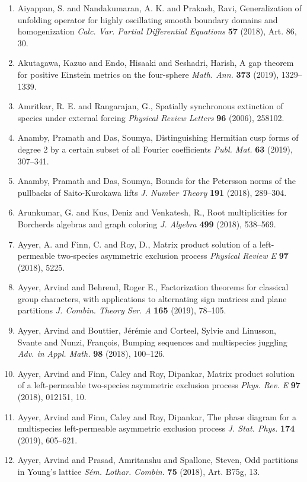 \begin{enumerate}
\item Aiyappan, S. and Nandakumaran, A. K. and Prakash, Ravi, Generalization of unfolding operator for highly oscillating
smooth boundary domains and homogenization {\em Calc. Var. Partial Differential Equations} {\bf 57} (2018), Art. 86, 30.
\item Akutagawa, Kazuo and Endo, Hisaaki and Seshadri, Harish, A gap theorem for positive {E}instein metrics on the
four-sphere {\em Math. Ann.} {\bf 373} (2019), 1329--1339.
\item Amritkar, R. E. and Rangarajan, G., Spatially synchronous extinction of species under external forcing {\em Physical Review Letters} {\bf 96} (2006), 258102.
\item Anamby, Pramath and Das, Soumya, Distinguishing {H}ermitian cusp forms of degree 2 by a certain
subset of all {F}ourier coefficients {\em Publ. Mat.} {\bf 63} (2019), 307--341.
\item Anamby, Pramath and Das, Soumya, Bounds for the {P}etersson norms of the pullbacks of
{S}aito-{K}urokawa lifts {\em J. Number Theory} {\bf 191} (2018), 289--304.
\item Arunkumar, G. and Kus, Deniz and Venkatesh, R., Root multiplicities for {B}orcherds algebras and graph
coloring {\em J. Algebra} {\bf 499} (2018), 538--569.
\item Ayyer, A. and Finn, C. and Roy, D., Matrix product solution of a left-permeable two-species asymmetric exclusion process {\em Physical Review E} {\bf 97} (2018), 5225.
\item Ayyer, Arvind and Behrend, Roger E., Factorization theorems for classical group characters, with
applications to alternating sign matrices and plane
partitions {\em J. Combin. Theory Ser. A} {\bf 165} (2019), 78--105.
\item Ayyer, Arvind and Bouttier, J\'{e}r\'{e}mie and Corteel, Sylvie and
Linusson, Svante and Nunzi, Fran\c{c}ois, Bumping sequences and multispecies juggling {\em Adv. in Appl. Math.} {\bf 98} (2018), 100--126.
\item Ayyer, Arvind and Finn, Caley and Roy, Dipankar, Matrix product solution of a left-permeable two-species
asymmetric exclusion process {\em Phys. Rev. E} {\bf 97} (2018), 012151, 10.
\item Ayyer, Arvind and Finn, Caley and Roy, Dipankar, The phase diagram for a multispecies left-permeable asymmetric
exclusion process {\em J. Stat. Phys.} {\bf 174} (2019), 605--621.
\item Ayyer, Arvind and Prasad, Amritanshu and Spallone, Steven, Odd partitions in {Y}oung's lattice {\em S\'{e}m. Lothar. Combin.} {\bf 75} (2018), Art. B75g, 13.

\end{enumerate}
